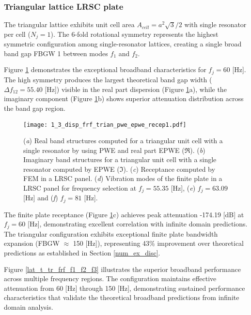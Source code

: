 \documentclass[review,numbers,sort&compress]{elsarticle}
\begin{document}
\subsubsection{Triangular lattice LRSC plate}\label{panel_lat_t}

The triangular lattice exhibits unit cell area $A_{cell} = a^2\sqrt{3}/2$ with single resonator per cell ($N_j = 1$). The 6-fold rotational symmetry represents the highest symmetric configuration among single-resonator lattices, creating a single broad band gap FBGW 1 between modes $f_1$ and $f_2$.

Figure \ref{lat_t_pwe_epwe_tr_frf} demonstrates the exceptional broadband characteristics for $f_j = 60$ [Hz]. The high symmetry produces the largest theoretical band gap width ($\Delta f_{12} = 55.40$ [Hz]) visible in the real part dispersion (Figure \ref{lat_t_pwe_epwe_tr_frf}a), while the imaginary component (Figure \ref{lat_t_pwe_epwe_tr_frf}b) shows superior attenuation distribution across the band gap region.

\begin{figure}[htb]
	\centering
	\texttt{[image: 1\_3\_disp\_frf\_trian\_pwe\_epwe\_recep1.pdf]}
	\caption{(\textit{a}) Real band structures computed for a triangular unit cell with a single resonator by using PWE and real part EPWE ($\Re$). (\textit{b}) Imaginary band structures for a triangular unit cell with a single resonator computed by EPWE ($\Im$). (\textit{c}) Receptance computed by FEM in a LRSC panel. (\textit{d}) Vibration modes of the finite plate in a LRSC panel for frequency selection at $f_j = 55.35$ [Hz], (\textit{e}) $f_j = 63.09$ [Hz] and (\textit{f}) $f_j = 81$ [Hz].}
	\label{lat_t_pwe_epwe_tr_frf}
\end{figure}

The finite plate receptance (Figure \ref{lat_t_pwe_epwe_tr_frf}c) achieves peak attenuation -174.19 [dB] at $f_j = 60$ [Hz], demonstrating excellent correlation with infinite domain predictions. The triangular configuration exhibits exceptional finite plate bandwidth expansion (FBGW $\approx$ 150 [Hz]), representing 43\% improvement over theoretical predictions as established in Section \ref{num_ex_disc}.

Figure \ref{lat_t_tr_frf_f1_f2_f3} illustrates the superior broadband performance across multiple frequency regions. The configuration maintains effective attenuation from 60 [Hz] through 150 [Hz], demonstrating sustained performance characteristics that validate the theoretical broadband predictions from infinite domain analysis.
\end{document}
